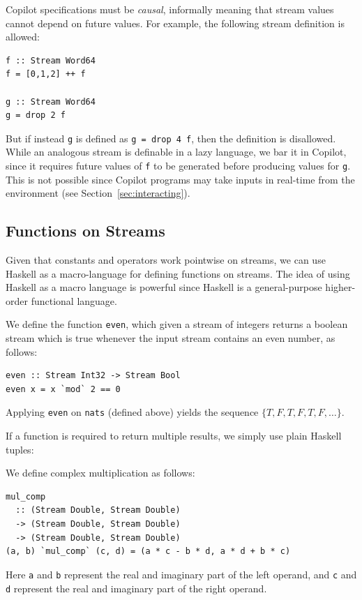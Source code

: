 Copilot specifications must be \emph{causal}, informally meaning that
stream values cannot depend on future values.  For example, the following stream
definition is allowed:
%
\begin{lstlisting}[language = Copilot, frame = single]
f :: Stream Word64
f = [0,1,2] ++ f

g :: Stream Word64
g = drop 2 f
\end{lstlisting}
%

But if instead {\tt g} is defined as {\tt g = drop 4 f}, then the definition is
disallowed.  While an analogous stream is definable in a lazy language, we bar
it in Copilot, since it requires future values of {\tt f} to be
generated before producing values for {\tt g}.  This is not possible since
Copilot programs may take inputs in real-time from the environment (see
Section~\ref{sec:interacting}).

\subsection{Functions on Streams} \label{sec:FnOnStreams}

Given that constants and operators work pointwise on streams, we can use Haskell
as a macro-language for defining functions on streams.  The idea of using
Haskell as a macro language is powerful since Haskell is a
general-purpose higher-order functional language.

\begin{example}
We define the function {\tt even}, which given a stream of
integers returns a boolean stream which is true whenever the input stream
contains an even number, as follows:
%
\begin{lstlisting}[language = Copilot, frame = single]
even :: Stream Int32 -> Stream Bool
even x = x `mod` 2 == 0
\end{lstlisting}
%
Applying {\tt even} on {\tt nats} (defined above) yields the sequence
$\{T, F, T, F, T, F, \dots\}$.
\end{example}

If a function is required to return multiple results, we simply use plain
Haskell tuples:

\begin{example}
We define complex multiplication as follows:
%
\begin{lstlisting}[language = Copilot, frame = single]
mul_comp
  :: (Stream Double, Stream Double)
  -> (Stream Double, Stream Double)
  -> (Stream Double, Stream Double)
(a, b) `mul_comp` (c, d) = (a * c - b * d, a * d + b * c)
\end{lstlisting}
%
Here {\tt a} and {\tt b} represent the real and imaginary part of the left
operand, and {\tt c} and {\tt d} represent the real and imaginary part
of the right operand.
\end{example}

